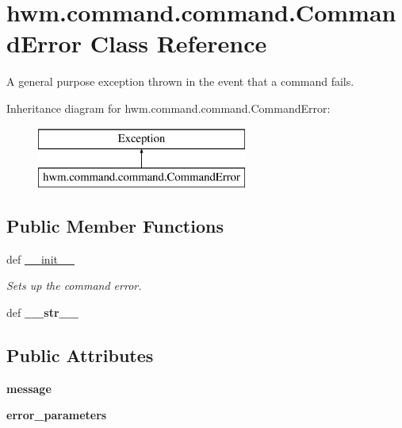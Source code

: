 \hypertarget{classhwm_1_1command_1_1command_1_1_command_error}{\section{hwm.\-command.\-command.\-Command\-Error Class Reference}
\label{classhwm_1_1command_1_1command_1_1_command_error}
}


A general purpose exception thrown in the event that a command fails.  


Inheritance diagram for hwm.\-command.\-command.\-Command\-Error\-:\begin{figure}[H]
\begin{center}
\leavevmode
\includegraphics[height=2.000000cm]{classhwm_1_1command_1_1command_1_1_command_error}
\end{center}
\end{figure}
\subsection*{Public Member Functions}
\begin{DoxyCompactItemize}
\item 
def \hyperlink{classhwm_1_1command_1_1command_1_1_command_error_a88d2545897a406152e087b31d951ee64}{\-\_\-\-\_\-init\-\_\-\-\_\-}
\begin{DoxyCompactList}\small\item\em Sets up the command error. \end{DoxyCompactList}\item 
\hypertarget{classhwm_1_1command_1_1command_1_1_command_error_a84a3bc8d7d0a1414823da1d05c4d4abc}{def {\bfseries \-\_\-\-\_\-str\-\_\-\-\_\-}}\label{classhwm_1_1command_1_1command_1_1_command_error_a84a3bc8d7d0a1414823da1d05c4d4abc}

\end{DoxyCompactItemize}
\subsection*{Public Attributes}
\begin{DoxyCompactItemize}
\item 
\hypertarget{classhwm_1_1command_1_1command_1_1_command_error_a9a544ad650f5613142cb3e8fb049d6c9}{{\bfseries message}}\label{classhwm_1_1command_1_1command_1_1_command_error_a9a544ad650f5613142cb3e8fb049d6c9}

\item 
\hypertarget{classhwm_1_1command_1_1command_1_1_command_error_ad7dc99967f7c3c8019f3fe724331595c}{{\bfseries error\-\_\-parameters}}\label{classhwm_1_1command_1_1command_1_1_command_error_ad7dc99967f7c3c8019f3fe724331595c}

\end{DoxyCompactItemize}


